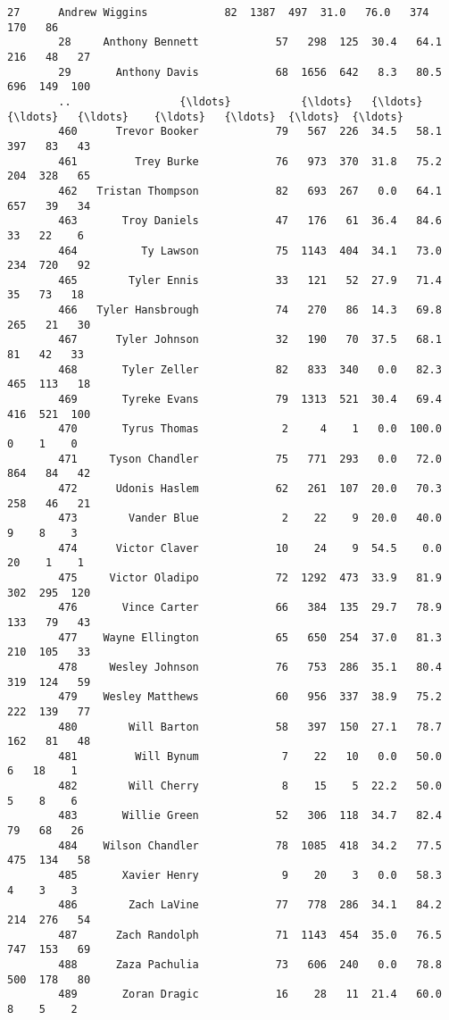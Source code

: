 \documentclass[11pt]{article}
\begin{document}
\begin{Verbatim}[commandchars=\\\{\}]
        27      Andrew Wiggins            82  1387  497  31.0   76.0   374  170   86   
        28     Anthony Bennett            57   298  125  30.4   64.1   216   48   27   
        29       Anthony Davis            68  1656  642   8.3   80.5   696  149  100   
        ..                 {\ldots}           {\ldots}   {\ldots}  {\ldots}   {\ldots}    {\ldots}   {\ldots}  {\ldots}  {\ldots}   
        460      Trevor Booker            79   567  226  34.5   58.1   397   83   43   
        461         Trey Burke            76   973  370  31.8   75.2   204  328   65   
        462   Tristan Thompson            82   693  267   0.0   64.1   657   39   34   
        463       Troy Daniels            47   176   61  36.4   84.6    33   22    6   
        464          Ty Lawson            75  1143  404  34.1   73.0   234  720   92   
        465        Tyler Ennis            33   121   52  27.9   71.4    35   73   18   
        466   Tyler Hansbrough            74   270   86  14.3   69.8   265   21   30   
        467      Tyler Johnson            32   190   70  37.5   68.1    81   42   33   
        468       Tyler Zeller            82   833  340   0.0   82.3   465  113   18   
        469       Tyreke Evans            79  1313  521  30.4   69.4   416  521  100   
        470       Tyrus Thomas             2     4    1   0.0  100.0     0    1    0   
        471     Tyson Chandler            75   771  293   0.0   72.0   864   84   42   
        472      Udonis Haslem            62   261  107  20.0   70.3   258   46   21   
        473        Vander Blue             2    22    9  20.0   40.0     9    8    3   
        474      Victor Claver            10    24    9  54.5    0.0    20    1    1   
        475     Victor Oladipo            72  1292  473  33.9   81.9   302  295  120   
        476       Vince Carter            66   384  135  29.7   78.9   133   79   43   
        477    Wayne Ellington            65   650  254  37.0   81.3   210  105   33   
        478     Wesley Johnson            76   753  286  35.1   80.4   319  124   59   
        479    Wesley Matthews            60   956  337  38.9   75.2   222  139   77   
        480        Will Barton            58   397  150  27.1   78.7   162   81   48   
        481         Will Bynum             7    22   10   0.0   50.0     6   18    1   
        482        Will Cherry             8    15    5  22.2   50.0     5    8    6   
        483       Willie Green            52   306  118  34.7   82.4    79   68   26   
        484    Wilson Chandler            78  1085  418  34.2   77.5   475  134   58   
        485       Xavier Henry             9    20    3   0.0   58.3     4    3    3   
        486        Zach LaVine            77   778  286  34.1   84.2   214  276   54   
        487      Zach Randolph            71  1143  454  35.0   76.5   747  153   69   
        488      Zaza Pachulia            73   606  240   0.0   78.8   500  178   80   
        489       Zoran Dragic            16    28   11  21.4   60.0     8    5    2   
        

\end{Verbatim}
\end{document}
